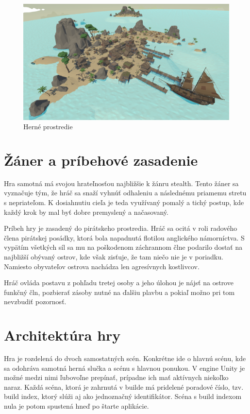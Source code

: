 \documentclass[slovak, master]{diploma}
\begin{document}
\begin{figure}[!htbp]
    \centering
    \includegraphics[width=.9\textwidth]{Figures/game_compressed.png}
    \caption{Herné prostredie}
    \label{pic:GameScreenshot}
\end{figure}

\section{Žáner a príbehové zasadenie}
\label{sec:GenreAndSetting}
Hra samotná má svojou hrateľnosťou najbližšie k žánru stealth. Tento žáner sa vyznačuje tým, že hráč sa snaží vyhnúť odhaleniu a následnému priamemu stretu s nepriateľom. K dosiahnutiu cieľa je teda využívaný pomalý a tichý postup, kde každý krok by mal byť dobre premyslený a načasovaný. 

Príbeh hry je zasadený do pirátskeho prostredia. Hráč sa ocitá v roli radového člena pirátskej posádky, ktorá bola napadnutá flotilou anglického námorníctva. S vypätím všetkých síl sa mu na poškodenom záchrannom člne podarilo dostať na najbližší obývaný ostrov, kde však zisťuje, že tam niečo nie je v poriadku. Namiesto obyvateľov ostrova nachádza len agresívnych kostlivcov. 

Hráč ovláda postavu z pohľadu tretej osoby a jeho úlohou je nájsť na ostrove funkčný čln, pozbierať zásoby nutné na ďalšiu plavbu a pokiaľ možno pri tom nevzbudiť pozornosť.

\section{Architektúra hry}
\label{sec:GameStructure}
Hra je rozdelená do dvoch samostatných scén. Konkrétne ide o hlavnú scénu, kde sa odohráva samotná herná slučka a scénu s hlavnou ponukou. V engine Unity je možné medzi nimi ľubovoľne prepínať, prípadne ich mať aktívnych niekoľko naraz. Každá scéna, ktorá je zahrnutá v builde má pridelené poradové číslo, tzv. build index, ktorý slúži aj ako jednoznačný identifikátor. Scéna s build indexom nula je potom spustená hneď po štarte aplikácie.
\end{document}
